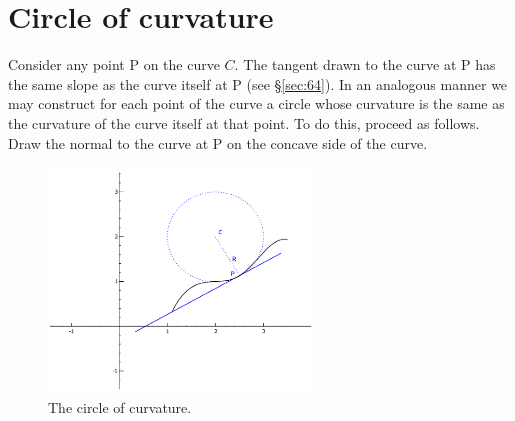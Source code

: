 \section{Circle of curvature}
\label{sec:104}

Consider any point P on the curve $C$. The tangent drawn to 
the curve at P has the same slope as the curve itself 
at P (see \S \ref{sec:64}). %
In an analogous manner we may construct for each point of the 
curve a circle whose curvature is the same as the curvature 
of the curve itself at that point. To do this, proceed as 
follows. Draw the normal to the curve at P on the concave 
side of the curve. 

\begin{figure}[h!]
\begin{minipage}{\textwidth}
\begin{center}
\includegraphics[height=6cm,width=7cm]{circle-curvature2.eps}
\end{center}
\end{minipage}
\caption{The circle of curvature.}
\label{fig:circle-curvature}
\end{figure}


